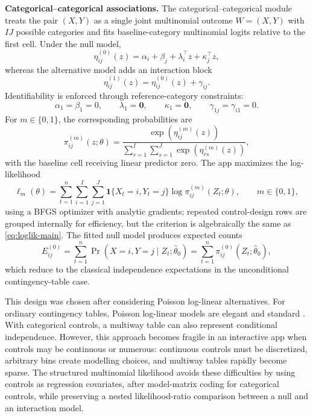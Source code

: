 \documentclass[preprint,12pt,a4paper]{elsarticle}
\numberwithin{equation}{section}
\begin{document}
\textbf{Categorical--categorical associations.} The categorical--categorical module treats the pair $(X,Y)$ as a single joint multinomial outcome $W=(X,Y)$ with $I J$ possible categories and fits baseline-category multinomial logits relative to the first cell. Under the null model,
\begin{equation}
\eta^{(0)}_{ij}(z)=\alpha_i+\beta_j+\lambda_i^\top z+\kappa_j^\top z,
\label{eq:eta0-main}
\end{equation}
whereas the alternative model adds an interaction block
\begin{equation}
\eta^{(1)}_{ij}(z)=\eta^{(0)}_{ij}(z)+\gamma_{ij}.
\label{eq:eta1-main}
\end{equation}
Identifiability is enforced through reference-category constraints:
\begin{equation}
\alpha_1=\beta_1=0,\qquad
\lambda_1=\mathbf{0},\qquad
\kappa_1=\mathbf{0},\qquad
\gamma_{1j}=\gamma_{i1}=0.
\label{eq:constraints-main}
\end{equation}
For $m\in\{0,1\}$, the corresponding probabilities are
\begin{equation}
\pi^{(m)}_{ij}(z;\theta)=
\frac{\exp\!\left(\eta^{(m)}_{ij}(z)\right)}
{\sum_{r=1}^{I}\sum_{s=1}^{J}\exp\!\left(\eta^{(m)}_{rs}(z)\right)},
\label{eq:pi-main}
\end{equation}
with the baseline cell receiving linear predictor zero. The app maximizes the log-likelihood
\begin{equation}
\ell_m(\theta)=
\sum_{t=1}^{n}\sum_{i=1}^{I}\sum_{j=1}^{J}
\mathbf{1}\{X_t=i,Y_t=j\}\log \pi^{(m)}_{ij}(Z_t;\theta),
\qquad m\in\{0,1\},
\label{eq:loglik-main}
\end{equation}
using a BFGS optimizer with analytic gradients; repeated control-design rows are grouped internally for efficiency, but the criterion is algebraically the same as \eqref{eq:loglik-main}. The fitted null model produces expected counts
\begin{equation}
E^{(0)}_{ij}=
\sum_{t=1}^{n}\Pr(X=i,Y=j\mid Z_t;\widehat{\theta}_0)
=
\sum_{t=1}^{n}\pi^{(0)}_{ij}(Z_t;\widehat{\theta}_0),
\label{eq:e0-main}
\end{equation}
which reduce to the classical independence expectations in the unconditional contingency-table case.

This design was chosen after considering Poisson log-linear alternatives. For ordinary contingency tables, Poisson log-linear models are elegant and standard \cite{agresti2013,nelder1972}. With categorical controls, a multiway table can also represent conditional independence. However, this approach becomes fragile in an interactive app when controls may be continuous or numerous: continuous controls must be discretized, arbitrary bins create modelling choices, and multiway tables rapidly become sparse. The structured multinomial likelihood avoids these difficulties by using controls as regression covariates, after model-matrix coding for categorical controls, while preserving a nested likelihood-ratio comparison between a null and an interaction model.
\end{document}
